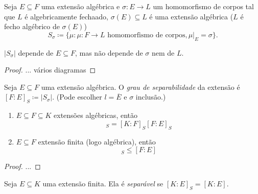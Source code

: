 \begin{defi}
	Seja $E \subseteq F$ uma extensão algébrica e $\sigma:E \to L$ um homomorfismo de corpos tal que $L$ é algebricamente fechaado, $\sigma(E) \subseteq L$ é uma extensão algébrica ($L$ é fecho algébrico de $\sigma(E)$)
	\begin{equation*}
	S_\sigma \coloneqq \{\mu : \mu: F \to L \text{\ homomorfismo de corpos}, \mu|_E=\sigma\}.
	\end{equation*}
\end{defi}

\begin{lema}
	$|S_\sigma|$ depende de $E \subseteq F$, mas não depende de $\sigma$ nem de $L$.
\end{lema}
\begin{proof}
... vários diagramas
\end{proof}

\begin{defi}
	Seja $E \subseteq F$ uma extensão algébrica. O \emph{grau de separabilidade} da extensão é $[F:E]_S \coloneqq |S_\sigma|$. (Pode escolher $l=\overline{E}$ e $\sigma$ inclusão.)
\end{defi}

\begin{teo}
	\begin{enumerate}
	\item $E \subseteq F \subseteq K$ extensões algébricas, então
		\begin{equation*}
		[K:E]_S = [K:F]_S[F:E]_S
		\end{equation*}
	\item $E \subseteq F$ extensão finita (logo algébrica), então
		\begin{equation*}
		[F:E]_S \leq [F:E]
		\end{equation*}
	\end{enumerate}
\end{teo}
\begin{proof}
...
\end{proof}

\begin{defi}
	Seja $E \subseteq K$ uma extensão finita. Ela é \emph{separável} se $[K:E]_S=[K:E]$.
\end{defi}

